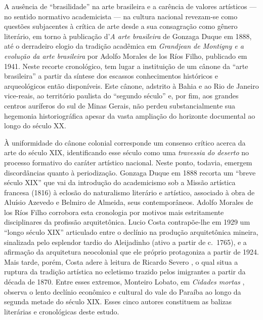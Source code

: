 A ausência de ``brasilidade'' na arte brasileira e a carência de valores
artísticos --- no sentido normativo academicista --- na cultura nacional
revezam-se como questões subjacentes à crítica de arte desde a sua
consagração como gênero literário, em torno à publicação d'\emph{A arte
brasileira} de Gonzaga Duque em 1888, até o derradeiro elogio da
tradição acadêmica em \emph{Grandjean de Montigny e a evolução da arte
brasileira} por Adolfo Morales de los Ríos Filho, publicado em 1941.
Neste recorte cronológico, tem lugar a instituição de um cânone da
``arte brasileira'' a partir da síntese dos escassos conhecimentos
históricos e arqueológicos então disponíveis. Este cânone, adstrito à
Bahia e ao Rio de Janeiro vice-reais, ao território paulista do
``segundo século'' e, por fim, aos grandes centros auríferos do sul de
Minas Gerais, não perdeu substancialmente sua hegemonia historiográfica
apesar da vasta ampliação do horizonte documental ao longo do século XX.

À uniformidade do cânone colonial corresponde um consenso crítico acerca
da arte do século XIX, identificando esse século como uma
\emph{travessia do deserto} no processo formativo do caráter artístico
nacional. Neste ponto, todavia, emergem discordâncias quanto à
periodização. Gonzaga Duque em 1888 \autocite*{gonzagaduque:1995arte}
recorta um ``breve século XIX'' que vai da introdução do academicismo
sob a Missão artística francesa (1816) à eclosão do naturalismo
literário e artístico, associado à obra de Aluísio Azevedo e Belmiro de
Almeida, seus contemporâneos. Adolfo Morales de los Ríos Filho
\autocite*{morales:1941grandjean} corrobora esta cronologia por motivos
mais estritamente disciplinares da profissão arquitetônica. Lucio Costa
\autocite*{costa:2007aleijadinho} contrapõe-lhe em 1929 um ``longo
século XIX'' articulado entre o declínio na produção arquitetônica
mineira, sinalizada pelo esplendor tardio do Aleijadinho (ativo a partir
de c.~1765), e a afirmação da arquitetura neocolonial que ele próprio
protagoniza a partir de 1924. Mais tarde, porém, Costa adere à leitura
de Ricardo Severo \autocite*{severo:1917arte}, o qual situa a ruptura da
tradição artística no ecletismo trazido pelos imigrantes a partir da
década de 1870. Entre esses extremos, Monteiro Lobato, em \emph{Cidades
mortas} \autocite*{monteirolobato:1919cidades}, observa o lento declínio
econômico e cultural do vale do Paraíba ao longo da segunda metade do
século XIX. Esses cinco autores constituem as balizas literárias e
cronológicas deste estudo.

